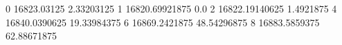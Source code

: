 0 16823.03125 2.33203125
1 16820.69921875 0.0
2 16822.19140625 1.4921875
4 16840.0390625 19.33984375
6 16869.2421875 48.54296875
8 16883.5859375 62.88671875
